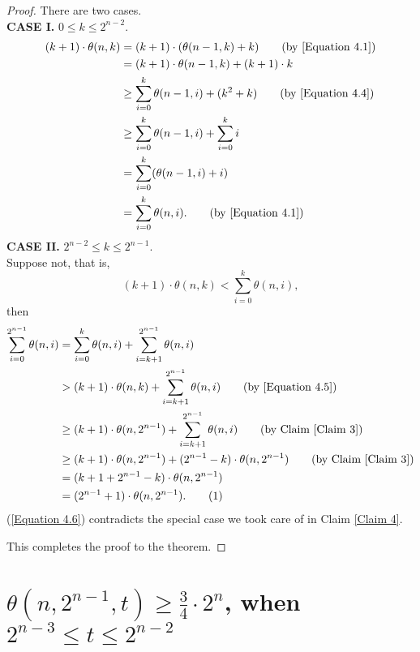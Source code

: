 \documentclass[12pt]{ucthesis}
\newcommand\numberthis{\addtocounter{equation}{1}\tag{\theequation}}
\theoremstyle{plain}
\theoremstyle{definition}
\begin{document}
\begin{proof}
There are two cases. \\
\textbf{CASE I.} $0 \le k \le 2^{n - 2}$.
\begin{align*}
(k + 1) \cdot \theta(n, k)
& = (k + 1) \cdot (\theta(n - 1, k) + k) \tag{by \ref{Equation 4.1}} \\
& = (k + 1) \cdot \theta(n - 1, k) + (k + 1) \cdot k \\
& \ge \sum_{i = 0}^k \theta(n - 1, i) + (k^2 + k) \tag{by \ref{Equation 4.4}} \\
& \ge \sum_{i = 0}^k \theta(n - 1, i) + \sum_{i = 0}^k i \\
& = \sum_{i = 0}^k (\theta(n - 1, i) + i) \\
& = \sum_{i = 0}^k \theta(n, i). \tag{by \ref{Equation 4.1}}
\end{align*}
\textbf{CASE II.} $2^{n - 2} \le k \le 2^{n - 1}$. \\
Suppose not, that is,
\begin{equation}
\label{Equation 4.5}
(k + 1) \cdot \theta(n, k) < \sum_{i = 0}^k \theta(n, i),
\end{equation}
then
\begin{align*}
\sum_{i = 0}^{2^{n - 1}} \theta(n, i)
& = \sum_{i = 0}^k \theta(n, i) + \sum_{i = k + 1}^{2^{n - 1}} \theta(n, i) \\
& > (k + 1) \cdot \theta(n, k) + \sum_{i = k + 1}^{2^{n - 1}} \theta(n, i) \tag{by \ref{Equation 4.5}} \\
& \ge (k + 1) \cdot \theta(n, 2^{n - 1}) + \sum_{i = k + 1}^{2^{n - 1}} \theta(n, i) \tag{by Claim \ref{Claim 3}} \\
& \ge (k + 1) \cdot \theta(n, 2^{n - 1}) + (2^{n - 1} - k) \cdot \theta(n, 2^{n - 1}) \tag{by Claim \ref{Claim 3}} \\
& = (k + 1 + 2^{n - 1} - k) \cdot \theta(n, 2^{n - 1}) \\
& = (2^{n - 1} + 1) \cdot \theta(n, 2^{n - 1}). \numberthis \label{Equation 4.6}
\end{align*}
(\ref{Equation 4.6}) contradicts the special case we took care of in Claim \ref{Claim 4}.

This completes the proof to the theorem.
\end{proof}

\section{$\theta(n, 2^{n - 1}, t) \ge \frac{3}{4} \cdot 2^n$, when $2^{n - 3} \le t \le 2^{n - 2}$}
\label{Section 4.2}
\end{document}
